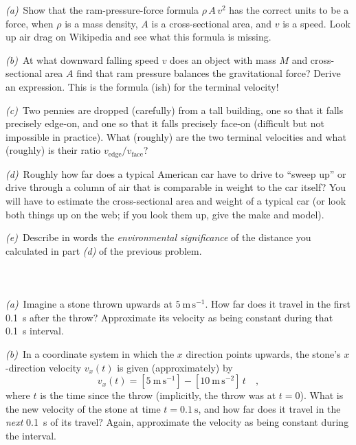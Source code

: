 \documentclass[12pt]{article}
\newcounter{problem}
\begin{document}
\textsl{(a)}~Show that the ram-pressure-force formula $\rho\,A\,v^2$ has the
correct units to be a force, when $\rho$ is a mass density, $A$ is a
cross-sectional area, and $v$ is a speed. Look up air drag on
Wikipedia and see what this formula is missing.

\textsl{(b)}~At what downward falling speed $v$ does an object with
mass $M$ and cross-sectional area $A$ find that ram pressure balances
the gravitational force? Derive an expression. This is the formula
(ish) for the terminal velocity!

\textsl{(c)}~Two pennies are dropped (carefully) from a tall building,
one so that it falls precisely edge-on, and one so that it falls
precisely face-on (difficult but not impossible in practice).  What
(roughly) are the two terminal velocities and what (roughly) is
their ratio $v_{\mathrm{edge}}/v_{\mathrm{face}}$?

\textsl{(d)}~Roughly how far does a typical American car have to drive
to ``sweep up'' or drive through a column of air that is comparable in
weight to the car itself?  You will have to estimate the
cross-sectional area and weight of a typical car (or look both things
up on the web; if you look them up, give the make and model).

\textsl{(e)}~Describe in words the \emph{environmental significance}
of the distance you calculated in part \textsl{(d)} of the previous
problem.

\paragraph{\problemname~\theproblem}

\textsl{(a)}~Imagine a stone thrown upwards at $5~\mathrm{m\,s^{-1}}$.
How far does it travel in the first 0.1~s after the throw?
Approximate its velocity as being constant during that 0.1~s interval.

\textsl{(b)}~In a coordinate system in which the $x$ direction points
upwards, the stone's $x$-direction velocity $v_x(t)$ is given
(approximately) by
\begin{equation}
v_x(t)= [5~\mathrm{m\,s^{-1}}]-[10~\mathrm{m\,s^{-2}}]\,t \quad ,
\label{eq:stone_velocity}
\end{equation}
where $t$ is the time since the throw (implicitly, the throw was at
$t=0$).  What is the new velocity of the stone at time
$t=0.1~\mathrm{s}$, and how far does it travel in the \emph{next}
0.1~s of its travel?  Again, approximate the velocity as being
constant during the interval.
\end{document}
